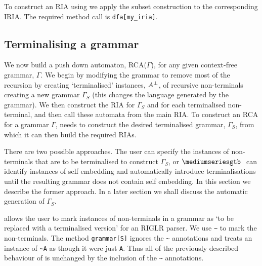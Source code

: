 To construct an RIA using \gtb we apply the subset construction to the
corresponding IRIA. The required \gtb method call is
\verb+dfa[my_iria]+.






\subsection{Terminalising a grammar}

We now build a push down automaton,
RCA($\Gamma$), for any given context-free grammar, $\Gamma$.
We begin by 
modifying the grammar to remove most of the recursion by creating
`terminalised' instances, ${A}^{\perp}$, of recursive non-terminals
creating a new grammar $\Gamma_S$
(this changes the language generated by the grammar). We then construct
the RIA for $\Gamma_S$ and for each terminalised non-terminal,
and then call these automata from the main RIA. 
To construct an RCA for a grammar
$\Gamma$, \gtb needs to construct the desired terminalised grammar,
$\Gamma_S$, from which it can then build the required RIAs.

There are two possible approaches. The user can specify the instances
of non-terminals that are to be terminalised to construct $\Gamma_S$,
or $\gtb$ can identify instances of self embedding and automatically
introduce terminalisations until the resulting grammar does not
contain self embedding. In this section we describe the former
approach. In a later section we shall discuss the automatic generation
of $\Gamma_S$.

\gtb allows the user to mark instances of non-terminals in a grammar as
`to be replaced with a terminalised version' for an RIGLR parser. We use
\verb+~+ to mark the non-terminals. The method
\verb+grammar[S]+ ignores the \verb+~+ annotations and treats an instance
of \verb+~A+ as though it were just \verb+A+. Thus all of the
previously described behaviour of \gtb is unchanged by the inclusion
of the \verb+~+ annotations. 

